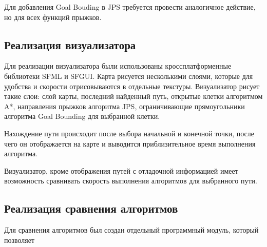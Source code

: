 Для добавления Goal Bouding в JPS требуется провести аналогичное действие, но для всех функций прыжков.

\subsection{Реализация визуализатора}

Для реализации визуализатора были использованы кроссплатформенные библиотеки SFML и SFGUI. Карта рисуется несколькими слоями, которые для удобства и скорости отрисовываются в отдельные текстуры. Визуализатор рисует такие слои: слой карты, последний найденный путь, открытые клетки алгоритмом A*, направления прыжков алгоритма JPS, ограничивающие прямоугольники алгоритма Goal Bounding для выбранной клетки.

Нахождение пути происходит после выбора начальной и конечной точки, после чего он отображается на карте и выводится приблизительное время выполнения алгоритма. 

Визуализатор, кроме отображения путей с отладочной информацией имеет возможность сравнивать скорость выполнения алгоритмов для выбранного пути.

\subsection{Реализация сравнения алгоритмов}

Для сравнения алгоритмов был создан отдельный программный модуль, который позволяет 
